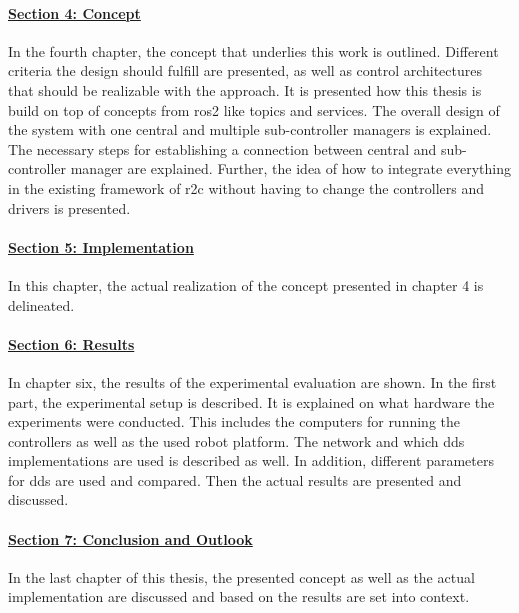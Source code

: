 \paragraph{\hyperref[sec:concept]{Section 4: Concept}}
In the fourth chapter, the concept that underlies this work is outlined. Different criteria the design should fulfill are presented, as well as control architectures that should be realizable with the approach. It is presented how this thesis is build on top of concepts from \gls{ros2} like \glspl{topic} and \glspl{service}. The overall design of the system with one central and multiple sub-controller managers is explained. The necessary steps for establishing a connection between central and sub-controller manager are explained. Further, the idea of how to integrate everything in the existing framework of \gls{r2c} without having to change the controllers and drivers is presented.

\paragraph{\hyperref[sec:implementation]{Section 5: Implementation}}
In this chapter, the actual realization of the concept presented in chapter 4 is delineated. 

\paragraph{\hyperref[sec:results]{Section 6: Results}}
In chapter six, the results of the experimental evaluation are shown. In the first part, the experimental setup is described. It is explained on what hardware the experiments were conducted. This includes the computers for running the controllers as well as the used robot platform. The network and which \gls{dds} implementations are used is described as well. In addition, different parameters for \gls{dds} are used and compared. \newline
Then the actual results are presented and discussed.

\paragraph{\hyperref[sec:conclusion_and_outlook]{Section 7: Conclusion and Outlook}}
In the last chapter of this thesis, the presented concept as well as the actual implementation are discussed and based on the results are set into context.





